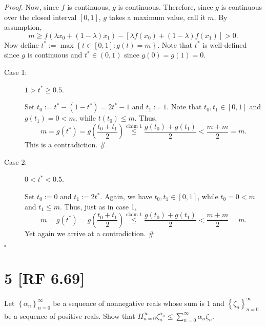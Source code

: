 \documentclass[12pt]{article}
\newcounter{ProofCounter}
\newenvironment{Proof}{\stepcounter{ProofCounter}\textit{Proof.}}{\hfill$\square$}
\begin{document}
\begin{Proof}
Now, since $f$ is continuous, $g$ is continuous. Therefore, since $g$ is continuous over the closed interval $[0,1]$, $g$ takes a maximum value, call
it $m$. By assumption, 
\[ m \geq f(\lambda x_{0} + (1-\lambda) x_{1}) - [\lambda f(x_{0}) + (1-\lambda)f(x_{1})] > 0. \]
Now define $t^{*} := \max\left\{ t \in [0,1] : g(t) = m \right\}$. Note that $t^{*}$ is well-defined since $g$ is
continuous and $t^{*} \in (0,1)$ since $g(0) = g(1) = 0$.

\begin{description}
\item[Case 1:] $1 > t^{*} \geq 0.5$.

Set $t_{0} := t^{*} - (1-t^{*}) = 2t^{*} - 1$ and $t_{1} := 1$. Note that $t_{0}, t_{1} \in [0,1]$ and $g(t_{1}) = 0 < m$, while $t(t_{0}) \leq m$.
Thus,
\[ m = g(t^{*}) = g\left( \frac{t_{0} + t_{1}}{2} \right) \stackrel{\text{claim 1}}{\leq} \frac{g(t_{0}) + g(t_{1})}{2} < \frac{m + m}{2} = m. \]
This is a contradiction. \#

\item[Case 2:] $0 < t^{*} < 0.5$.

Set $t_{0} := 0$ and $t_{1} := 2t^{*}$. Again, we have $t_{0}, t_{1} \in [0,1]$, while $t_{0} = 0 < m$ and $t_{1} \leq m$. Thus, just as in case 1,
\[ m = g(t^{*}) = g\left( \frac{t_{0} + t_{1}}{2} \right) \stackrel{\text{claim 1}}{\leq} \frac{g(t_{0}) + g(t_{1})}{2} < \frac{m + m}{2} = m. \]
Yet again we arrive at a contradiction. \#
\end{description}
\end{Proof}

\newpage 
\section*{5 [RF 6.69]}
Let $\left\{ \alpha_{n} \right\}_{n=0}^{\infty}$ be a sequence of nonnegative reals whose sum is 1 and $\left\{ \zeta_{n} \right\}_{n=0}^{\infty}$ be
a sequence of positive reals. Show that $\Pi_{n=0}^{\infty}\zeta_{n}^{\alpha_{n}} \leq \sum_{n=0}^{\infty}\alpha_{n}\zeta_{n}$.
\end{document}
